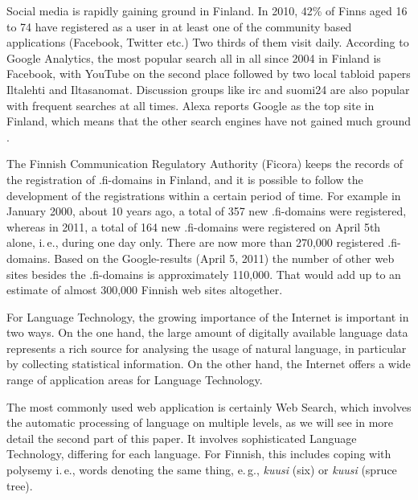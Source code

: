 \begin{multicols}{2}
Social media is rapidly gaining ground in Finland. In 2010, 42\% of Finns aged 16 to 74 have registered as a user in at least one of the community based applications (Facebook, Twitter etc.) Two thirds of them visit daily. According to Google Analytics, the most popular search all in all since 2004 in Finland is Facebook, with YouTube on the second place followed by two local tabloid papers Iltalehti and Iltasanomat. Discussion groups like irc and suomi24 are also popular with frequent searches at all times. Alexa reports Google as the top site in Finland, which means that the other search engines have not gained much ground \cite{topsites}.

The Finnish Communication Regulatory Authority (Ficora) keeps the records of the registration of .fi-domains in Finland, and it is possible to follow the development of the registrations within a certain period of time. For example in January 2000, about 10 years ago, a total of 357 new .fi-domains were registered, whereas in 2011, a total of 164 new .fi-domains were registered on April 5th alone, i.\,e., during one day only. There are now more than 270,000 registered .fi-domains. Based on the Google-results (April 5, 2011) the number of other web sites besides the .fi-domains is approximately 110,000. That would add up to an estimate of almost 300,000 Finnish web sites altogether.

For Language Technology, the growing importance of the Internet is important in two ways. On the one hand, the large amount of digitally available language data represents a rich source for analysing the usage of natural language, in particular by collecting statistical information. On the other hand, the Internet offers a wide range of application areas for Language Technology.

The most commonly used web application is certainly Web Search, which involves the automatic processing of language on multiple levels, as we will see in more detail the second part of this paper. It involves sophisticated Language Technology, differing for each language. For Finnish, this includes coping with polysemy i.\,e., words denoting the same thing, e.\,g., \textit{\foreignlanguage{finnish}{\textit{kuusi}}} (six) or \textit{\foreignlanguage{finnish}{\textit{kuusi}}} (spruce tree).


\end{multicols}
